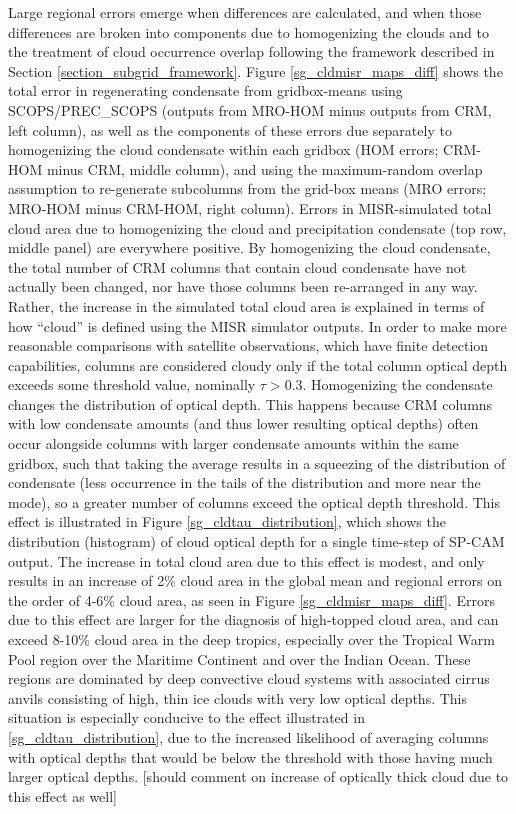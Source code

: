 Large regional errors emerge when differences are calculated, and when those differences are broken into components due to homogenizing the clouds and to the treatment of cloud occurrence overlap following the framework described in Section \ref{section_subgrid_framework}. Figure \ref{sg_cldmisr_maps_diff} shows the total error in regenerating condensate from gridbox-means using SCOPS/PREC\_SCOPS (outputs from MRO-HOM minus outputs from CRM, left column), as well as the components of these errors due separately to homogenizing the cloud condensate within each gridbox (HOM errors; CRM-HOM minus CRM, middle column), and using the maximum-random overlap assumption to re-generate subcolumns from the grid-box means (MRO errors; MRO-HOM minus CRM-HOM, right column). Errors in MISR-simulated total cloud area due to homogenizing the cloud and precipitation condensate (top row, middle panel) are everywhere positive. By homogenizing the cloud condensate, the total number of CRM columns that contain cloud condensate have not actually been changed, nor have those columns been re-arranged in any way. Rather, the increase in the simulated total cloud area is explained in terms of how ``cloud'' is defined using the MISR simulator outputs. In order to make more reasonable comparisons with satellite observations, which have finite detection capabilities, columns are considered cloudy only if the total column optical depth exceeds some threshold value, nominally $\tau > 0.3$. Homogenizing the condensate changes the distribution of optical depth. This happens because CRM columns with low condensate amounts (and thus lower resulting optical depths) often occur alongside columns with larger condensate amounts within the same gridbox, such that taking the average results in a squeezing of the distribution of condensate (less occurrence in the tails of the distribution and more near the mode), so a greater number of columns exceed the optical depth threshold. This effect is illustrated in Figure \ref{sg_cldtau_distribution}, which shows the distribution (histogram) of cloud optical depth for a single time-step of SP-CAM output. The increase in total cloud area due to this effect is modest, and only results in an increase of 2\% cloud area in the global mean and regional errors on the order of 4-6\% cloud area, as seen in Figure \ref{sg_cldmisr_maps_diff}. Errors due to this effect are larger for the diagnosis of high-topped cloud area, and can exceed 8-10\% cloud area in the deep tropics, especially over the Tropical Warm Pool region over the Maritime Continent and over the Indian Ocean. These regions are dominated by deep convective cloud systems with associated cirrus anvils consisting of high, thin ice clouds with very low optical depths. This situation is especially conducive to the effect illustrated in \ref{sg_cldtau_distribution}, due to the increased likelihood of averaging columns with optical depths that would be below the threshold with those having much larger optical depths. [should comment on increase of optically thick cloud due to this effect as well]

